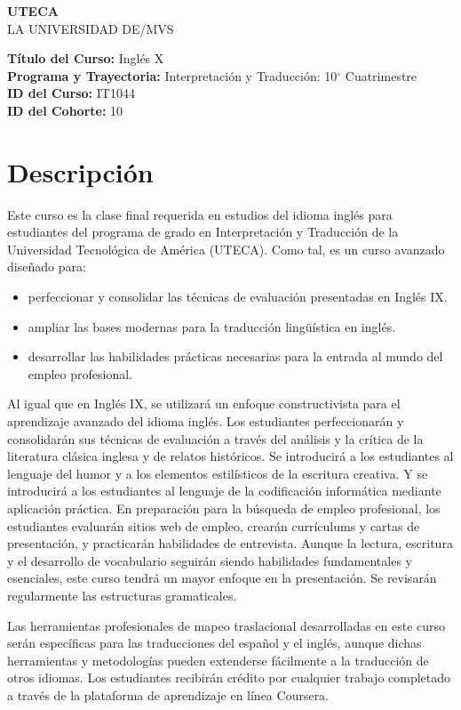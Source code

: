 \documentclass[12pt]{article}
\begin{document}
\noindent\textbf{UTECA} \\
\noindent LA UNIVERSIDAD DE/MVS

\vspace{1cm} %

\noindent\textbf{Título del Curso:} Inglés X \\
\noindent\textbf{Programa y Trayectoria:} Interpretación y Traducción: 10$^\circ$ Cuatrimestre \\
\noindent\textbf{ID del Curso:} IT1044 \\
\noindent\textbf{ID del Cohorte:} 10

\section*{Descripción}
Este curso es la clase final requerida en estudios del idioma inglés para estudiantes del programa de grado en Interpretación y Traducción de la Universidad Tecnológica de América (UTECA). Como tal, es un curso avanzado diseñado para:
\begin{itemize}
    \item perfeccionar y consolidar las técnicas de evaluación presentadas en Inglés IX.
    \item ampliar las bases modernas para la traducción lingüística en inglés.
    \item desarrollar las habilidades prácticas necesarias para la entrada al mundo del empleo profesional.
\end{itemize}
Al igual que en Inglés IX, se utilizará un enfoque constructivista para el aprendizaje avanzado del idioma inglés. Los estudiantes perfeccionarán y consolidarán sus técnicas de evaluación a través del análisis y la crítica de la literatura clásica inglesa y de relatos históricos. Se introducirá a los estudiantes al lenguaje del humor y a los elementos estilísticos de la escritura creativa. Y se introducirá a los estudiantes al lenguaje de la codificación informática mediante aplicación práctica. En preparación para la búsqueda de empleo profesional, los estudiantes evaluarán sitios web de empleo, crearán currículums y cartas de presentación, y practicarán habilidades de entrevista. Aunque la lectura, escritura y el desarrollo de vocabulario seguirán siendo habilidades fundamentales y esenciales, este curso tendrá un mayor enfoque en la presentación. Se revisarán regularmente las estructuras gramaticales.

Las herramientas profesionales de mapeo traslacional desarrolladas en este curso serán específicas para las traducciones del español y el inglés, aunque dichas herramientas y metodologías pueden extenderse fácilmente a la traducción de otros idiomas. Los estudiantes recibirán crédito por cualquier trabajo completado a través de la plataforma de aprendizaje en línea Coursera.
\end{document}
